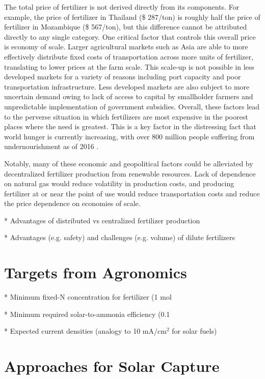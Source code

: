 The total price of fertilizer is not derived directly from its components. For example, the price of fertilizer in Thailand (\$ 287/ton) is roughly half the price of fertilizer in Mozambique (\$ 567/ton), but this difference cannot be attributed directly to any single category. One critical factor that controls this overall price is economy of scale. Larger agricultural markets such as Asia are able to more effectively distribute fixed costs of transportation across more units of fertilizer, translating to lower prices at the farm scale. This scale-up is not possible in less developed markets for a variety of reasons including port capacity and poor transportation infrastructure. Less developed markets are also subject to more uncertain demand owing to lack of access to capital by smallholder farmers and unpredictable implementation of government subsidies. Overall, these factors lead to the perverse situation in which fertilizers are most expensive in the poorest places where the need is greatest. This is a key factor in the distressing fact that world hunger is currently increasing, with over 800 million people suffering from undernourishment as of 2016 \cite{FAO_2017}.

Notably, many of these economic and geopolitical factors could be alleviated by decentralized fertilizer production from renewable resources. Lack of dependence on natural gas would reduce volatility in production costs, and producing fertilizer at or near the point of use would reduce transportation costs and reduce the price dependence on economies of scale. 

* Advantages of distributed vs centralized fertilizer production

* Advantages (e.g. safety) and challenges (e.g. volume) of dilute fertilizers

\section{Targets from Agronomics}
* Minimum fixed-N concentration for fertilizer (1 mol%

* Minimum required solar-to-ammonia efficiency (0.1 %

* Expected current densities (analogy to 10 mA/cm$^2$ for solar fuels)

\section{Approaches for Solar Capture}

